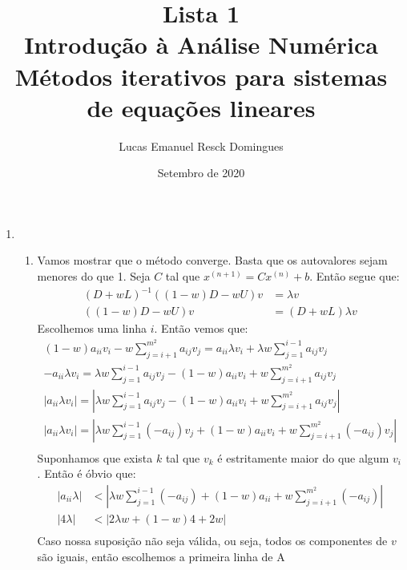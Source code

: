 \documentclass{article}
\title{Lista 1 \\
\large Introdução à Análise Numérica \\
Métodos iterativos para sistemas de equações lineares}
\author{Lucas Emanuel Resck Domingues}
\date{Setembro de 2020}
\begin{document}
    \maketitle

    \begin{enumerate}
        \item \begin{enumerate}
                \item Vamos mostrar que o método converge.
                    Basta que os autovalores sejam menores do que 1.
                    Seja $C$ tal que $x^{(n+1)} = Cx^{(n)} + b$. Então segue que:
                    \begin{align*}
                        (D+wL)^{-1}((1-w)D-wU)v &= \lambda v \\
                        ((1-w)D-wU)v &= (D+wL)\lambda v
                    \end{align*}
                    Escolhemos uma linha $i$. Então vemos que:
                    \begin{align*}
                        (1-w)a_{ii}v_i - w \sum_{j=i+1}^{m^2} a_{ij}v_j = a_{ii} \lambda v_i + \lambda w \sum_{j=1}^{i-1} a_{ij}v_j \\
                        -a_{ii} \lambda v_i = \lambda w \sum_{j=1}^{i-1} a_{ij}v_j - (1-w)a_{ii}v_i + w \sum_{j=i+1}^{m^2} a_{ij}v_j \\
                        |a_{ii} \lambda v_i| = \left|\lambda w \sum_{j=1}^{i-1} a_{ij}v_j - (1-w)a_{ii}v_i + w \sum_{j=i+1}^{m^2} a_{ij}v_j\right| \\
                        |a_{ii} \lambda v_i| = \left|\lambda w \sum_{j=1}^{i-1} (-a_{ij})v_j + (1-w)a_{ii}v_i + w \sum_{j=i+1}^{m^2} (-a_{ij})v_j\right| \\
                    \end{align*}
                    Suponhamos que exista $k$ tal que $v_k$ é estritamente maior do que algum $v_i$. Então é óbvio que:
                    \begin{align*}
                        |a_{ii} \lambda| &< \left|\lambda w \sum_{j=1}^{i-1} (-a_{ij}) + (1-w)a_{ii} + w \sum_{j=i+1}^{m^2} (-a_{ij})\right| \\
                        |4 \lambda| &< \left|2\lambda w + (1-w)4 + 2w\right| \\
                    \end{align*}
                    Caso nossa suposição não seja válida, ou seja, todos os componentes de $v$ são iguais, então escolhemos a primeira linha de A

\end{enumerate}
\end{enumerate}
\end{document}
